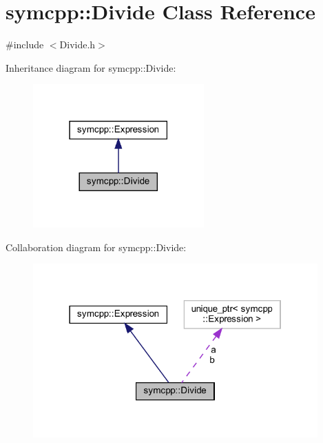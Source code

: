 \hypertarget{classsymcpp_1_1Divide}{}\section{symcpp\+::Divide Class Reference}
\label{classsymcpp_1_1Divide}


{\ttfamily \#include $<$Divide.\+h$>$}



Inheritance diagram for symcpp\+::Divide\+:
\nopagebreak
\begin{figure}[H]
\begin{center}
\leavevmode
\includegraphics[width=186pt]{classsymcpp_1_1Divide__inherit__graph}
\end{center}
\end{figure}


Collaboration diagram for symcpp\+::Divide\+:
\nopagebreak
\begin{figure}[H]
\begin{center}
\leavevmode
\includegraphics[width=310pt]{classsymcpp_1_1Divide__coll__graph}
\end{center}
\end{figure}
